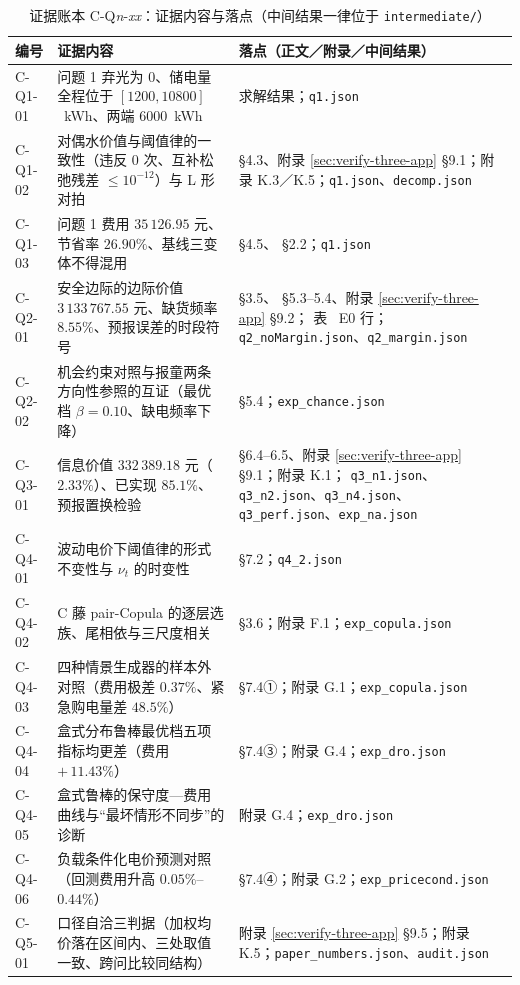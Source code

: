 \begin{table}[htbp]
  \centering
  \caption{证据账本 C-Q\emph{n}-\emph{xx}：证据内容与落点（中间结果一律位于 \texttt{intermediate/}）}
  \label{tab:evid-ledger}
  \footnotesize
  \setlength{\tabcolsep}{4pt}
  \begin{tabularx}{\linewidth}{C{1.5cm} L{6.4cm} Y}
    \toprule
    编号 & 证据内容 & 落点（正文／附录／中间结果） \\
    \midrule
    C-Q1-01 & 问题 1 弃光为 \(0\)、储电量全程位于 \([1200,10800]\)~kWh、两端 \(6000\)~kWh
      &  求解结果；\texttt{q1.json} \\
    C-Q1-02 & 对偶水价值与阈值律的一致性（违反 0 次、互补松弛残差 \(\le10^{-12}\)）与 L 形对拍
      &  \S4.3、附录 \ref{sec:verify-three-app} \S9.1；附录 K.3／K.5；\texttt{q1.json}、\texttt{decomp.json} \\
    C-Q1-03 & 问题 1 费用 \(35\,126.95\) 元、节省率 \(26.90\%\)、基线三变体不得混用
      &  \S4.5、 \S2.2；\texttt{q1.json} \\
    C-Q2-01 & 安全边际的边际价值 \(3\,133\,767.55\) 元、缺货频率 \(8.55\%\)、预报误差的时段符号
      &  \S3.5、 \S5.3--5.4、附录 \ref{sec:verify-three-app} \S9.2；
        表~ E0 行；\texttt{q2\_noMargin.json}、\texttt{q2\_margin.json} \\
    C-Q2-02 & 机会约束对照与报童两条方向性参照的互证（最优档 \(\beta=0.10\)、缺电频率下降）
      &  \S5.4；\texttt{exp\_chance.json} \\
    C-Q3-01 & 信息价值 \(332\,389.18\) 元（\(2.33\%\)）、已实现 \(85.1\%\)、预报置换检验
      &  \S6.4--6.5、附录 \ref{sec:verify-three-app} \S9.1；附录 K.1；
        \texttt{q3\_n1.json}、\texttt{q3\_n2.json}、\texttt{q3\_n4.json}、\texttt{q3\_perf.json}、\texttt{exp\_na.json} \\
    C-Q4-01 & 波动电价下阈值律的形式不变性与 \(\nu_t\) 的时变性
      &  \S7.2；\texttt{q4\_2.json} \\
    C-Q4-02 & C 藤 pair-Copula 的逐层选族、尾相依与三尺度相关
      &  \S3.6；附录 F.1；\texttt{exp\_copula.json} \\
    C-Q4-03 & 四种情景生成器的样本外对照（费用极差 \(0.37\%\)、紧急购电量差 \(48.5\%\)）
      &  \S7.4①；附录 G.1；\texttt{exp\_copula.json} \\
    C-Q4-04 & 盒式分布鲁棒最优档五项指标均更差（费用 \(+\,11.43\%\)）
      &  \S7.4③；附录 G.4；\texttt{exp\_dro.json} \\
    C-Q4-05 & 盒式鲁棒的保守度—费用曲线与“最坏情形不同步”的诊断
      & 附录 G.4；\texttt{exp\_dro.json} \\
    C-Q4-06 & 负载条件化电价预测对照（回测费用升高 \(0.05\%\)--\(0.44\%\)）
      &  \S7.4④；附录 G.2；\texttt{exp\_pricecond.json} \\
    C-Q5-01 & 口径自洽三判据（加权均价落在区间内、三处取值一致、跨问比较同结构）
      & 附录 \ref{sec:verify-three-app} \S9.5；附录 K.5；\texttt{paper\_numbers.json}、\texttt{audit.json} \\
    \bottomrule
  \end{tabularx}
\end{table}

